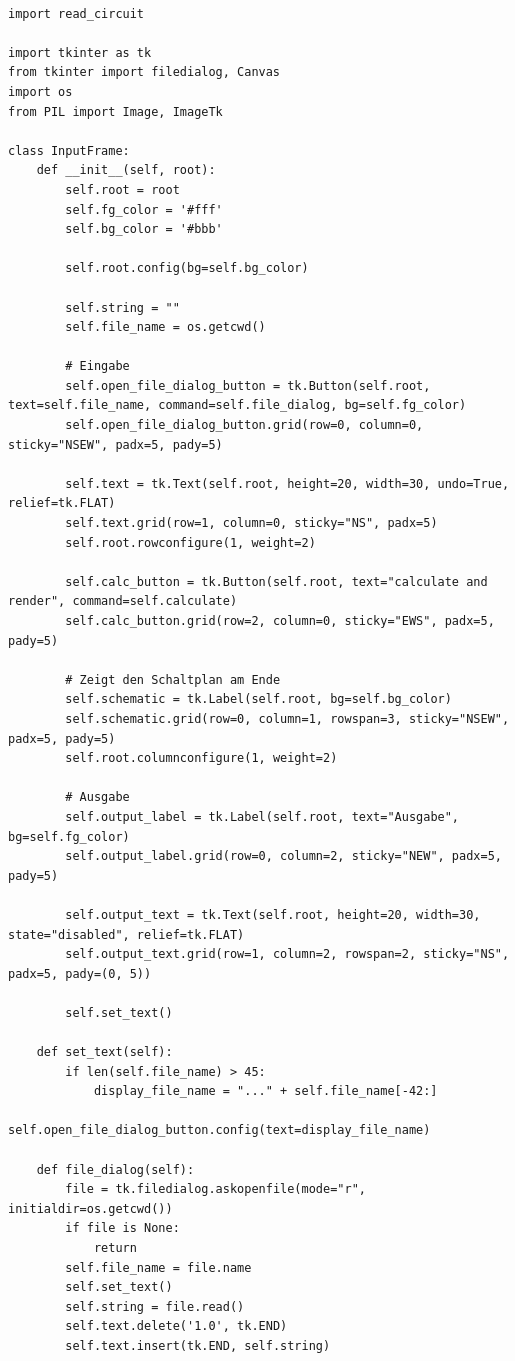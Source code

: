 \documentclass[a4paper,10pt,ngerman]{scrartcl}
\begin{document}
\begin{lstlisting}

import read_circuit

import tkinter as tk
from tkinter import filedialog, Canvas
import os
from PIL import Image, ImageTk

class InputFrame:
    def __init__(self, root):
        self.root = root
        self.fg_color = '#fff'
        self.bg_color = '#bbb'

        self.root.config(bg=self.bg_color)

        self.string = ""
        self.file_name = os.getcwd()

        # Eingabe
        self.open_file_dialog_button = tk.Button(self.root, text=self.file_name, command=self.file_dialog, bg=self.fg_color)
        self.open_file_dialog_button.grid(row=0, column=0, sticky="NSEW", padx=5, pady=5)

        self.text = tk.Text(self.root, height=20, width=30, undo=True, relief=tk.FLAT)
        self.text.grid(row=1, column=0, sticky="NS", padx=5)
        self.root.rowconfigure(1, weight=2)

        self.calc_button = tk.Button(self.root, text="calculate and render", command=self.calculate)
        self.calc_button.grid(row=2, column=0, sticky="EWS", padx=5, pady=5)

        # Zeigt den Schaltplan am Ende
        self.schematic = tk.Label(self.root, bg=self.bg_color)
        self.schematic.grid(row=0, column=1, rowspan=3, sticky="NSEW", padx=5, pady=5)
        self.root.columnconfigure(1, weight=2)

        # Ausgabe
        self.output_label = tk.Label(self.root, text="Ausgabe", bg=self.fg_color)
        self.output_label.grid(row=0, column=2, sticky="NEW", padx=5, pady=5)

        self.output_text = tk.Text(self.root, height=20, width=30, state="disabled", relief=tk.FLAT)
        self.output_text.grid(row=1, column=2, rowspan=2, sticky="NS", padx=5, pady=(0, 5))

        self.set_text()

    def set_text(self):
        if len(self.file_name) > 45:
            display_file_name = "..." + self.file_name[-42:]
            self.open_file_dialog_button.config(text=display_file_name)

    def file_dialog(self):
        file = tk.filedialog.askopenfile(mode="r", initialdir=os.getcwd())
        if file is None:
            return
        self.file_name = file.name
        self.set_text()
        self.string = file.read()
        self.text.delete('1.0', tk.END)
        self.text.insert(tk.END, self.string)


\end{lstlisting}
\end{document}

